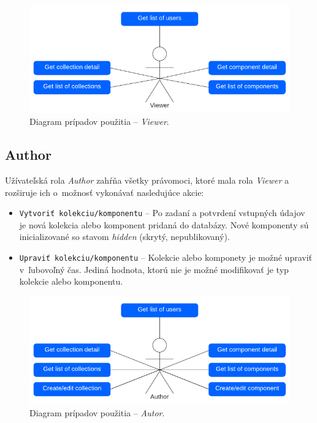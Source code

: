 \begin{figure}[h]
	\centering
	\includegraphics[scale=0.9]{obrazky-figures/viewer_use_case}
	\caption{Diagram prípadov použitia -- \emph{Viewer}.}
\end{figure}

\subsection{Author}
Užívateľská rola \emph{Author} zahŕňa všetky právomoci, ktoré mala rola \emph{Viewer} a rozširuje ich o~možnosť vykonávať nasledujúce akcie:

\begin{itemize}
	\item \texttt{Vytvoriť kolekciu/komponentu} -- Po zadaní a potvrdení vstupných údajov je nová kolekcia alebo komponent pridaná do databázy. Nové komponenty sú inicializované so stavom \emph{hidden} (skrytý, nepublikovaný).
	\item \texttt{Upraviť kolekciu/komponentu} -- Kolekcie alebo komponety je možné upraviť v~ľubovoľný čas. Jediná hodnota, ktorú nie je možné modifikovať je typ kolekcie alebo komponentu.
\end{itemize}

\begin{figure}[h]
	\centering
	\includegraphics[scale=0.9]{obrazky-figures/author_use_case}
	\caption{Diagram prípadov použitia -- \emph{Autor}.}
\end{figure}

